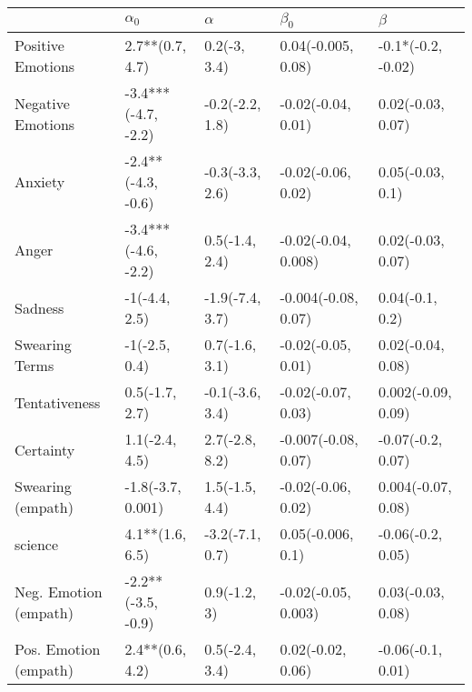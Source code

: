 \begin{tabular}{lllll}
\toprule
{} &           $\alpha_0$ &         $\alpha$ &            $\beta_0$ &             $\beta$ \\
\midrule
Positive Emotions     &      2.7**(0.7, 4.7) &     0.2(-3, 3.4) &   0.04(-0.005, 0.08) &  -0.1*(-0.2, -0.02) \\
Negative Emotions     &  -3.4***(-4.7, -2.2) &  -0.2(-2.2, 1.8) &   -0.02(-0.04, 0.01) &   0.02(-0.03, 0.07) \\
Anxiety               &   -2.4**(-4.3, -0.6) &  -0.3(-3.3, 2.6) &   -0.02(-0.06, 0.02) &    0.05(-0.03, 0.1) \\
Anger                 &  -3.4***(-4.6, -2.2) &   0.5(-1.4, 2.4) &  -0.02(-0.04, 0.008) &   0.02(-0.03, 0.07) \\
Sadness               &        -1(-4.4, 2.5) &  -1.9(-7.4, 3.7) &  -0.004(-0.08, 0.07) &     0.04(-0.1, 0.2) \\
Swearing Terms        &        -1(-2.5, 0.4) &   0.7(-1.6, 3.1) &   -0.02(-0.05, 0.01) &   0.02(-0.04, 0.08) \\
Tentativeness         &       0.5(-1.7, 2.7) &  -0.1(-3.6, 3.4) &   -0.02(-0.07, 0.03) &  0.002(-0.09, 0.09) \\
Certainty             &       1.1(-2.4, 4.5) &   2.7(-2.8, 8.2) &  -0.007(-0.08, 0.07) &   -0.07(-0.2, 0.07) \\
Swearing (empath)     &    -1.8(-3.7, 0.001) &   1.5(-1.5, 4.4) &   -0.02(-0.06, 0.02) &  0.004(-0.07, 0.08) \\
science               &      4.1**(1.6, 6.5) &  -3.2(-7.1, 0.7) &    0.05(-0.006, 0.1) &   -0.06(-0.2, 0.05) \\
Neg. Emotion (empath) &   -2.2**(-3.5, -0.9) &     0.9(-1.2, 3) &  -0.02(-0.05, 0.003) &   0.03(-0.03, 0.08) \\
Pos. Emotion (empath) &      2.4**(0.6, 4.2) &   0.5(-2.4, 3.4) &    0.02(-0.02, 0.06) &   -0.06(-0.1, 0.01) \\
\bottomrule
\end{tabular}
